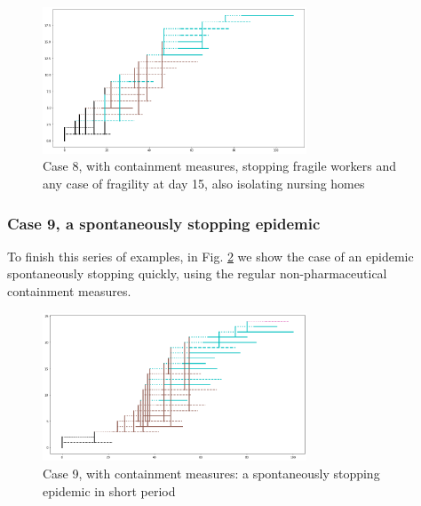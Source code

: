 \documentclass[11pt]{article}
\begin{document}
\begin{figure}[H]
\begin{center}
\includegraphics[width=0.7\textwidth]{withShort1B.png}%
\caption{Case 8, with containment measures, stopping fragile workers and any case of fragility at day 15, also isolating nursing homes}
\label{1B}
\end{center}
\end{figure}



\subsubsection{Case 9, a spontaneously stopping epidemic}
\label{c9}

To finish this series of examples, in Fig. \ref{2} we show the case of an epidemic spontaneously stopping quickly, using the regular non-pharmaceutical containment measures.

\begin{figure}[H]
\begin{center}
\includegraphics[width=0.7\textwidth]{withShort2.png}%
\caption{Case 9, with containment measures: a spontaneously stopping epidemic in  short period}
\label{2}
\end{center}
\end{figure}
\end{document}
